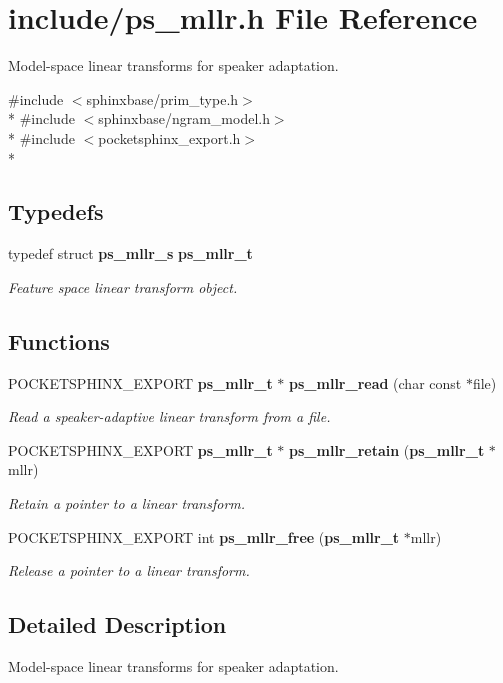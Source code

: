 \section{include/ps\+\_\+mllr.h File Reference}
\label{ps__mllr_8h}


Model-\/space linear transforms for speaker adaptation.  


{\ttfamily \#include $<$sphinxbase/prim\+\_\+type.\+h$>$}\\*
{\ttfamily \#include $<$sphinxbase/ngram\+\_\+model.\+h$>$}\\*
{\ttfamily \#include $<$pocketsphinx\+\_\+export.\+h$>$}\\*
\subsection*{Typedefs}
\begin{DoxyCompactItemize}
\item 
typedef struct {\bf ps\+\_\+mllr\+\_\+s} {\bf ps\+\_\+mllr\+\_\+t}\label{ps__mllr_8h_ad4b6bf4c3cb6a671f79f1d709857d5b1}

\begin{DoxyCompactList}\small\item\em Feature space linear transform object. \end{DoxyCompactList}\end{DoxyCompactItemize}
\subsection*{Functions}
\begin{DoxyCompactItemize}
\item 
P\+O\+C\+K\+E\+T\+S\+P\+H\+I\+N\+X\+\_\+\+E\+X\+P\+O\+R\+T {\bf ps\+\_\+mllr\+\_\+t} $\ast$ {\bf ps\+\_\+mllr\+\_\+read} (char const $\ast$file)\label{ps__mllr_8h_a05d268b1d79a1be2ae96093c96aad79d}

\begin{DoxyCompactList}\small\item\em Read a speaker-\/adaptive linear transform from a file. \end{DoxyCompactList}\item 
P\+O\+C\+K\+E\+T\+S\+P\+H\+I\+N\+X\+\_\+\+E\+X\+P\+O\+R\+T {\bf ps\+\_\+mllr\+\_\+t} $\ast$ {\bf ps\+\_\+mllr\+\_\+retain} ({\bf ps\+\_\+mllr\+\_\+t} $\ast$mllr)\label{ps__mllr_8h_a2f40deff6976bf03a845aa474494edfb}

\begin{DoxyCompactList}\small\item\em Retain a pointer to a linear transform. \end{DoxyCompactList}\item 
P\+O\+C\+K\+E\+T\+S\+P\+H\+I\+N\+X\+\_\+\+E\+X\+P\+O\+R\+T int {\bf ps\+\_\+mllr\+\_\+free} ({\bf ps\+\_\+mllr\+\_\+t} $\ast$mllr)\label{ps__mllr_8h_ae56a8c52dd7513b1883536f2a729e1d0}

\begin{DoxyCompactList}\small\item\em Release a pointer to a linear transform. \end{DoxyCompactList}\end{DoxyCompactItemize}


\subsection{Detailed Description}
Model-\/space linear transforms for speaker adaptation. 

